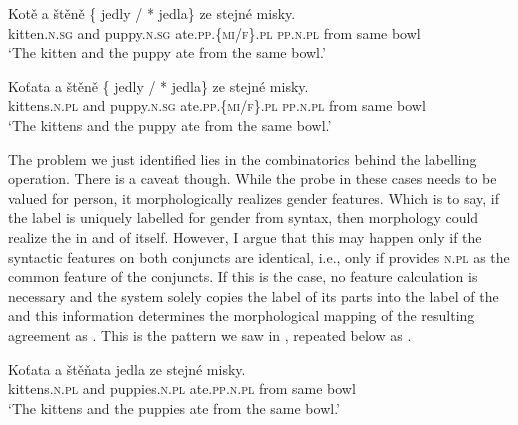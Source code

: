 \documentclass[output=paper,modfontsnewtxmath,hidelinks]{langscibook}
\begin{document}
\ea\gll Kotě a štěně \{\hspace{-2pt} jedly / *\hspace{-2pt} jedla\} ze stejné misky.\label{n-a-rep}\\
kitten.\textsc{n.sg} and puppy.\textsc{n.sg} {} ate.\textsc{pp.\{mi/f\}.pl} {} {} \textsc{pp.n.pl} from same bowl\\
\glt `The kitten and the puppy ate from the same bowl.'\\\hfill{}
\z

\ea\gll Koťata a štěně \{\hspace{-2pt} jedly / *\hspace{-2pt} jedla\} ze stejné misky.\label{n-b-rep}\\
kittens.\textsc{n.pl} and puppy.\textsc{n.sg} {} ate.\textsc{pp.\{mi/f\}.pl} {} {} \textsc{pp.n.pl} from same bowl\\
\glt `The kittens and the puppy ate from the same bowl.'\\\hfill{}
\z

\noindent The problem we just identified lies in the combinatorics behind the labelling operation. There is a caveat though. While the probe in these cases needs to be valued for person, it morphologically realizes gender features. Which is to say, if the label is uniquely labelled for gender from syntax, then morphology could realize the  in and of itself. However, I argue that this may happen only if the syntactic features on both conjuncts are identical, i.e., only if  provides \textsc{n.pl} as the common feature of the conjuncts. If this is the case, no feature calculation is necessary and the system solely copies the   label of its parts into the label of the  and this information determines the morphological mapping of the resulting agreement as  . This is the pattern we saw in , repeated below as .

\ea\gll Koťata a štěňata jedla ze stejné misky.\label{n-c-rep}\\
kittens.\textsc{n.pl} and puppies.\textsc{n.pl} ate.\textsc{pp.n.pl} from same bowl\label{n-pl2}\\
\glt `The kittens and the puppies  ate from the same bowl.' \hfill{}
\z
\end{document}
